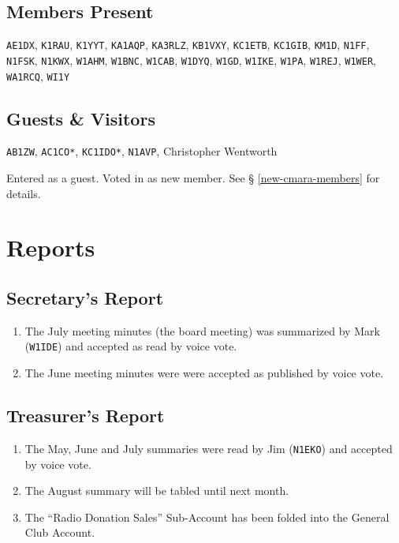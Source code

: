 \documentclass[10pt,letterpaper]{article}
\begin{document}
\subsection{Members Present}
\texttt{AE1DX},
\texttt{K1RAU},
\texttt{K1YYT},
\texttt{KA1AQP},
\texttt{KA3RLZ},
\texttt{KB1VXY},
\texttt{KC1ETB},
\texttt{KC1GIB},
\texttt{KM1D},
\texttt{N1FF},
\texttt{N1FSK},
\texttt{N1KWX},
\texttt{W1AHM},
\texttt{W1BNC},
\texttt{W1CAB},
\texttt{W1DYQ},
\texttt{W1GD},
\texttt{W1IKE},
\texttt{W1PA},
\texttt{W1REJ},
\texttt{W1WER},
\texttt{WA1RCQ},
\texttt{WI1Y}

\subsection{Guests \& Visitors}

\texttt{AB1ZW},
\texttt{AC1CO*},
\texttt{KC1IDO*},
\texttt{N1AVP},
Christopher Wentworth

\noindent
\textasteriskcentered{} Entered as a guest. Voted in as new member. See \S{} \ref{new-cmara-members} for details.

\section{Reports}

\subsection{Secretary's Report}
\begin{enumerate}
  \item The July meeting minutes (the board meeting) was summarized by Mark (\texttt{W1IDE}) and accepted as read by voice vote.
  \item The June meeting minutes were were accepted as published by voice vote.
\end{enumerate}

\newpage
\subsection{Treasurer's Report}
\begin{enumerate}
  \item The May, June and July summaries were read by Jim (\texttt{N1EKO}) and accepted by voice vote.
  \item The August summary will be tabled until next month.
  \item The ``Radio Donation Sales'' Sub-Account has been folded into the General Club Account.
\end{enumerate}
\end{document}
